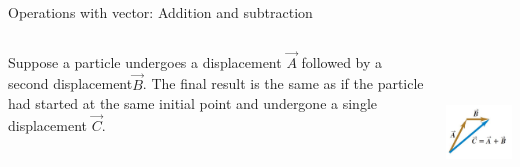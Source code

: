 \documentclass[]{beamer}
\begin{document}
  \begin{frame}

    Operations with vector: Addition and subtraction 
    
    \vspace{3 mm}
    \pause
    
    
       \begin{columns}[c]
       \column{2in}  %
    
    
    Suppose a particle undergoes a displacement $\vec{A}$ followed by a second displacement$\vec{B}$. 
    The final result is the same as if the particle had started at the same initial
    point and undergone a single displacement $\vec{C}$.
    
    
      
       \column{2in}
    
    
    
    
      \begin{center}
      \includegraphics[height=1.7in]{images/vectorsum1.jpg}
    \end{center}
    
    
       \end{columns}
    
    
    \end{frame}
    
\end{document}
